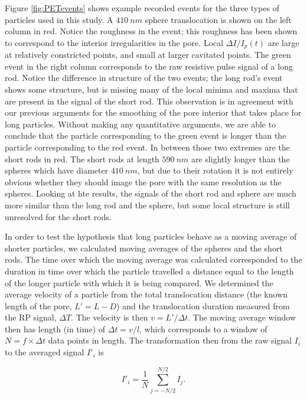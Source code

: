 		
		Figure \ref{fig:PETevents} shows example recorded events for the three types of particles used in this study. A $\SI{410}{nm}$ sphere translocation is shown on the left column in red. Notice the roughness in the event; this roughness has been shown to correspond to the interior irregularities in the pore. Local $\Delta I/I_{p}\left(t\right)$ are large at relatively constricted points, and small at larger cavitated points. The green event in the right column corresponds to the raw resistive pulse signal of a long rod. Notice the difference in structure of the two events; the long rod's event shows some structure, but is missing many of the local minima and maxima that are present in the signal of the short rod. This observation is in agreement with our previous arguments for the smoothing of the pore interior that takes place for long particles. Without making any quantitative arguments, we are able to conclude that the particle corresponding to the green event is longer than the particle corresponding to the red event. In between those two extremes are the short rods in red. The short rods at length $\SI{590}{nm}$ are slightly longer than the spheres which have diameter $\SI{410}{nm}$, but due to their rotation it is not entirely obvious whether they should image the pore with the same resolution as the spheres. Looking at hte results, the signals of the short rod and sphere are much more similar than the long rod and the sphere, but some local structure is still unresolved for the short rods. 
		
		In order to test the hypothesis that long particles behave as a moving average of shorter particles, we calculated moving averages of the spheres and the short rods. The time over which the moving average was calculated corresponded to the duration in time over which the particle travelled a distance equal to the length of the longer particle with which it is being compared. We determined the average velocity of a particle from the total translocation distance (the known length of the pore, $L'=L-D$) and the translocation duration measured from the RP signal, $\Delta T$. The velocity is then $v=L'/\Delta t$. The moving average window then has length (in time) of $\Delta t=v/l$, which corresponds to a window of $N=f\times\Delta t$ data points in length. The transformation then from the raw signal $I_{i}$ to the averaged signal $I'_{i}$ is
		
		
		\begin{equation} \label{eq:movingavg}
			I'_{i}=\frac{1}{N}\sum_{j=-N/2}^{N/2}I_{j}.
		\end{equation}
		
